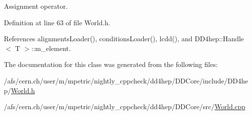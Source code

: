 Assignment operator. 



Definition at line 63 of file World.\+h.



References alignments\+Loader(), conditions\+Loader(), lcdd(), and D\+D4hep\+::\+Handle$<$ T $>$\+::m\+\_\+element.



The documentation for this class was generated from the following files\+:\begin{DoxyCompactItemize}
\item 
/afs/cern.\+ch/user/m/mpetric/nightly\+\_\+cppcheck/dd4hep/\+D\+D\+Core/include/\+D\+D4hep/\hyperlink{_world_8h}{World.\+h}\item 
/afs/cern.\+ch/user/m/mpetric/nightly\+\_\+cppcheck/dd4hep/\+D\+D\+Core/src/\hyperlink{_world_8cpp}{World.\+cpp}\end{DoxyCompactItemize}

